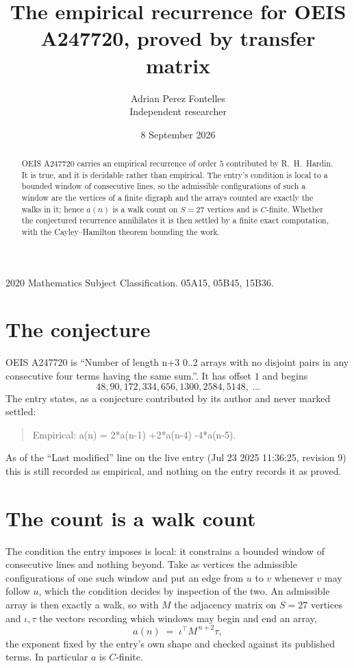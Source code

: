 \documentclass[11pt,a4paper]{article}
\title{The empirical recurrence for OEIS A247720, proved by transfer matrix}
\author{Adrian Perez Fontelles\\ \small Independent researcher}
\date{8 September 2026}
\theoremstyle{plain}
\theoremstyle{definition}
\begin{document}
\maketitle

\begin{abstract}
OEIS A247720 carries an empirical recurrence of order $5$ contributed by R.~H.~Hardin. It is
true, and it is decidable rather than empirical. The entry's condition is local to a bounded window of consecutive lines, so
the admissible configurations of such a window are the vertices of a finite digraph and the
arrays counted are exactly the walks in it; hence $a(n)$ is a walk count on $S=27$ vertices
and is $C$-finite. Whether the conjectured recurrence annihilates it is then settled by a
finite exact computation, with the Cayley--Hamilton theorem bounding the work.
\end{abstract}

\noindent\small 2020 Mathematics Subject Classification. 05A15, 05B45, 15B36.\normalsize

\section{The conjecture}

OEIS A247720 is ``Number of length n+3 0..2 arrays with no disjoint pairs in any consecutive four terms having the same sum.''. It has offset $1$ and begins
\[
48, 90, 172, 334, 656, 1300, 2584, 5148,\ \dots
\]
The entry states, as a conjecture contributed by its author and never marked settled:
\begin{quote}
Empirical: a(n) = 2*a(n-1) +2*a(n-4) -4*a(n-5).
\end{quote}
As of the ``Last modified'' line on the live entry (Jul 23 2025 11:36:25, revision 9) this is still
recorded as empirical, and nothing on the entry records it as proved.

\section{The count is a walk count}

The condition the entry imposes is local: it constrains a bounded window of consecutive lines and nothing beyond. Take as
vertices the admissible configurations of one such window and put an edge from $u$ to $v$
whenever $v$ may follow $u$, which the condition decides by inspection of the two. An
admissible array is then exactly a walk, so with $M$ the adjacency matrix on $S=27$ vertices
and $\iota,\tau$ the vectors recording which windows may begin and end an array,
\[
a(n)\;=\;\iota^{\!\top}M^{\,n+2}\tau ,
\]
the exponent fixed by the entry's own shape and checked against its published terms. In
particular $a$ is $C$-finite.
\end{document}
